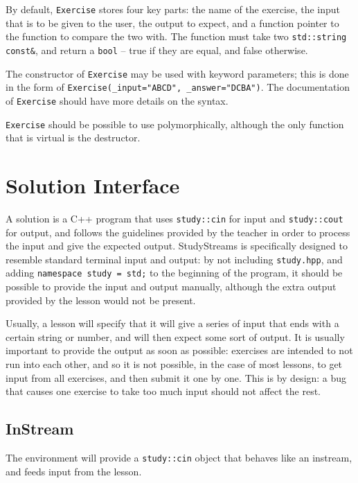 \documentclass[12pt,a4paper]{report}
\begin{document}
		By default, \texttt{Exercise} stores four key parts:  the name of the
		exercise, the input that is to be given to the user, the output to
		expect, and a function pointer to the function to compare the two with.
		The function must take two \texttt{std::string const&}, and return a
		\texttt{bool} -- true if they are equal, and false otherwise.

		The constructor of \texttt{Exercise} may be used with keyword parameters;
		this is done in the form of \texttt{Exercise(\_input="ABCD", \_answer="DCBA")}.
		The documentation of \texttt{Exercise} should have more details on the
		syntax.

		\texttt{Exercise} should be possible to use polymorphically, although
		the only function that is virtual is the destructor.

	\chapter{Solution Interface}
		A solution is a C++ program that uses \texttt{study::cin} for input and
		\texttt{study::cout} for output, and follows the guidelines provided by
		the teacher in order to process the input and give the expected output.
		StudyStreams is specifically designed to resemble standard terminal
		input and output:  by not including \texttt{study.hpp}, and adding
		\texttt{namespace study = std;} to the beginning of the program, it
		should be possible to provide the input and output manually, although
		the extra output provided by the lesson would not be present.

		Usually, a lesson will specify that it will give a series of input that
		ends with a certain string or number, and will then expect some sort of
		output.  It is usually important to provide the output as soon as
		possible:  exercises are intended to not run into each other, and so it
		is not possible, in the case of most lessons, to get input from all
		exercises, and then submit it one by one.  This is by design:  a bug
		that causes one exercise to take too much input should not affect the
		rest.

		\section{InStream}
		The environment will provide a \texttt{study::cin} object that behaves
		like an instream, and feeds input from the lesson.  
\end{document}
